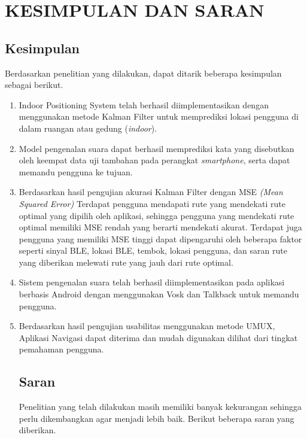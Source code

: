 \fancyhf{} 
\fancyfoot[C]{\thepage}
\chapter{KESIMPULAN DAN SARAN}

\section{Kesimpulan}
Berdasarkan penelitian yang dilakukan, dapat ditarik beberapa kesimpulan sebagai berikut.
\begin{enumerate}
	\item Indoor Positioning System telah berhasil diimplementasikan dengan menggunakan metode Kalman Filter untuk memprediksi lokasi pengguna di dalam ruangan atau gedung (\textit{indoor}).

   \item Model pengenalan suara dapat berhasil memprediksi kata yang disebutkan oleh keempat data uji tambahan pada perangkat \textit{smartphone}, serta dapat memandu pengguna ke tujuan.

   \item Berdasarkan hasil pengujian akurasi Kalman Filter dengan MSE \textit{(Mean Squared Error)} Terdapat pengguna mendapati rute yang mendekati rute optimal yang dipilih oleh aplikasi, sehingga pengguna yang mendekati rute optimal memiliki MSE rendah yang berarti mendekati akurat. Terdapat juga pengguna yang memiliki MSE tinggi dapat dipengaruhi oleh beberapa faktor seperti sinyal BLE, lokasi BLE, tembok, lokasi pengguna, dan saran rute yang diberikan melewati rute yang jauh dari rute optimal.

   \item Sistem pengenalan suara telah berhasil diimplementasikan pada aplikasi berbasis Android dengan menggunakan Vosk dan Talkback untuk memandu pengguna.

   \item Berdasarkan hasil pengujian usabilitas menggunakan metode UMUX, Aplikasi Navigasi dapat diterima dan mudah digunakan dilihat dari tingkat pemahaman pengguna.

  
\pagebreak
\section{Saran}
Penelitian yang telah dilakukan masih memiliki banyak kekurangan sehingga perlu dikembangkan agar menjadi lebih baik. Berikut beberapa saran yang diberikan.


\end{enumerate}
